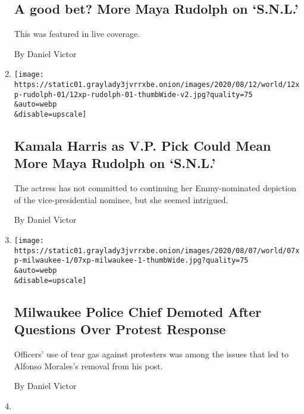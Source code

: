 \begin{enumerate}
  \hypertarget{a-good-bet-more-maya-rudolph-on-snl}{%
  \subsection{A good bet? More Maya Rudolph on
  `S.N.L.'}\label{a-good-bet-more-maya-rudolph-on-snl}}

  This was featured in live coverage.

  By Daniel Victor
\item
  \href{/2020/08/12/arts/television/maya-rudolph-kamala-harris-snl.html}{}

  \texttt{[image: https://static01.graylady3jvrrxbe.onion/images/2020/08/12/world/12xp-rudolph-01/12xp-rudolph-01-thumbWide-v2.jpg?quality=75\\\&auto=webp\\\&disable=upscale]}

  \hypertarget{kamala-harris-as-vp-pick-could-mean-more-maya-rudolph-on-snl}{%
  \subsection{Kamala Harris as V.P. Pick Could Mean More Maya Rudolph on
  `S.N.L.'}\label{kamala-harris-as-vp-pick-could-mean-more-maya-rudolph-on-snl}}

  The actress has not committed to continuing her Emmy-nominated
  depiction of the vice-presidential nominee, but she seemed intrigued.

  By Daniel Victor
\item
  \href{/2020/08/07/us/alfonso-morales-milwaukee-police.html}{}

  \texttt{[image: https://static01.graylady3jvrrxbe.onion/images/2020/08/07/world/07xp-milwaukee-1/07xp-milwaukee-1-thumbWide.jpg?quality=75\\\&auto=webp\\\&disable=upscale]}

  \hypertarget{milwaukee-police-chief-demoted-after-questions-over-protest-response}{%
  \subsection{Milwaukee Police Chief Demoted After Questions Over
  Protest
  Response}\label{milwaukee-police-chief-demoted-after-questions-over-protest-response}}

  Officers' use of tear gas against protesters was among the issues that
  led to Alfonso Morales's removal from his post.

  By Daniel Victor
\item
  \href{/2020/07/24/movies/mel-gibson-coronavirus.html}{}


\end{enumerate}
